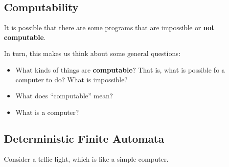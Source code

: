 \documentclass[10pt,oneside]{book}
\begin{document}
\newcommand{\cg}[1]{\color{OliveGreen}#1\color{white}}
\newcommand{\cb}[1]{\color{BlueViolet}#1\color{white}}

\subsection*{Computability}
It is possible that there are some programs that are impossible or \textbf{not computable}. 

In turn, this makes us think about some general questions:
\begin{itemize}
  \item What kinds of things are \textbf{computable}? That is, what is possible fo a computer to do? What is impossible?
  \item What does ``computable'' mean?
  \item What is a computer?
\end{itemize}

\subsection*{Deterministic Finite Automata}
Consider a trffic light, which is like a simple computer. 
\end{document}
